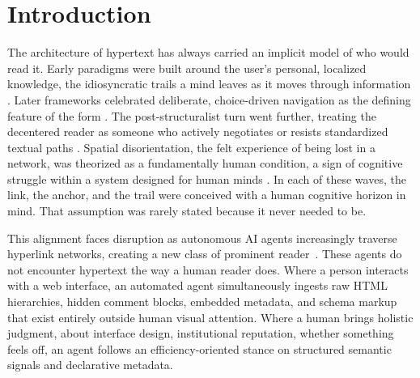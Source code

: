 \documentclass[sigconf,authordraft]{acmart}
\begin{document}
 


\maketitle

\section{Introduction}

The architecture of hypertext has always carried an implicit model of who would
read it. Early paradigms were built around the user's personal,
localized knowledge, the idiosyncratic trails a mind leaves as it moves
through information \cite{bush1945}. Later frameworks celebrated deliberate,
choice-driven navigation as the defining feature of the form \cite{nelson1965}.
The post-structuralist turn went further, treating the decentered reader as
someone who actively negotiates or resists standardized textual paths
\cite{landow2006hypertext}. Spatial disorientation, the felt experience of
being lost in a network, was theorized as a fundamentally human condition,
a sign of cognitive struggle within a system designed for human minds
\cite{conklin1987}. In each of these waves, the link, the anchor, and the trail
were conceived with a human cognitive horizon in mind. That assumption was
rarely stated because it never needed to be.

This alignment faces disruption as autonomous AI agents increasingly traverse
hyperlink networks, creating a new class of prominent reader~\cite{zhou2024webarena,deng2023mind2web}.
These agents do not encounter hypertext the way a human reader does. Where a person
interacts with a web interface, an automated agent simultaneously ingests raw
HTML hierarchies, hidden comment blocks, embedded metadata, and schema markup that
exist entirely outside human visual attention. Where a human brings holistic
judgment, about interface design, institutional reputation, whether something
feels off, an agent follows an efficiency-oriented stance on structured semantic signals and declarative metadata.
\end{document}
